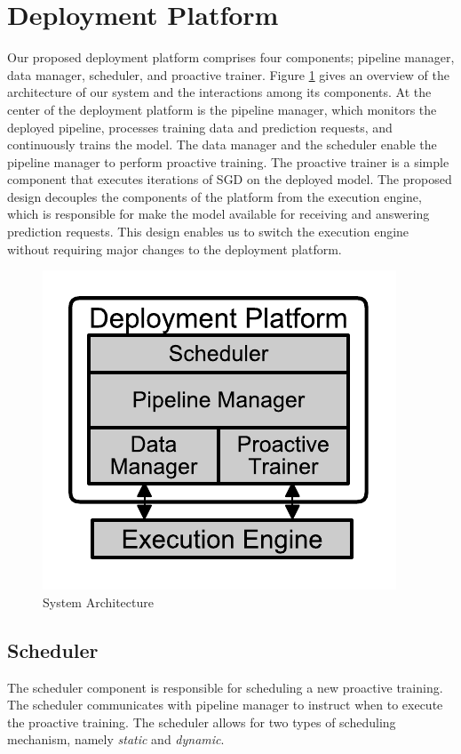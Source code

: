 \section{Deployment Platform} \label{sec:system-architecture}
Our proposed deployment platform comprises four components; pipeline manager, data manager, scheduler, and proactive trainer.
Figure \ref{fig:system-architecture} gives an overview of the architecture of our system and the interactions among its components.
At the center of the deployment platform is the pipeline manager, which monitors the deployed pipeline, processes training data and prediction requests, and continuously trains the model.
The data manager and the scheduler enable the pipeline manager to perform proactive training.
The proactive trainer is a simple component that executes iterations of SGD on the deployed model.
The proposed design decouples the components of the platform from the execution engine, which is responsible for make the model available for receiving and answering prediction requests.
This design enables us to switch the execution engine without requiring major changes to the deployment platform.

\begin{figure}[t]
\centering
\includegraphics[width=0.8\columnwidth]{../images/system-architecture.pdf}
\caption{System Architecture}
\label{fig:system-architecture}
\end{figure}

\subsection{Scheduler}\label{scheduler}
The scheduler component is responsible for scheduling a new proactive training.
The scheduler communicates with pipeline manager to instruct when to execute the proactive training.
The scheduler allows for two types of scheduling mechanism, namely \textit{static} and \textit{dynamic}.

